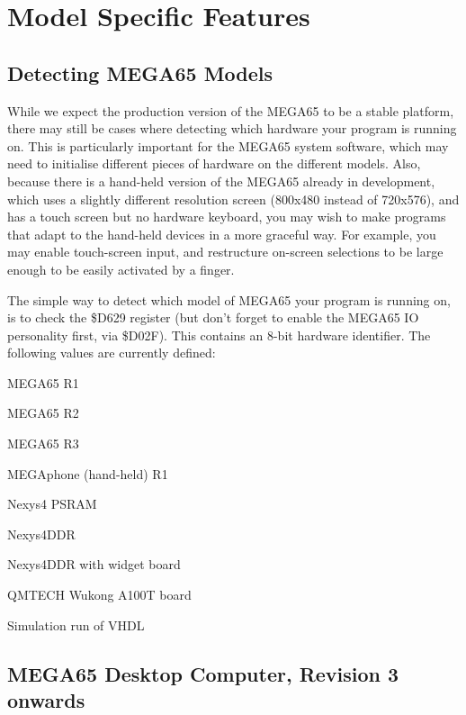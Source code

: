 \chapter{Model Specific Features}

\section{Detecting MEGA65 Models}

While we expect the production version of the MEGA65 to be a stable platform, there may still be
cases where detecting which hardware your program is running on. This is particularly important
for the MEGA65 system software, which may need to initialise different pieces of hardware on the
different models.  Also, because there is a hand-held version of the MEGA65 already  in development,
which uses a slightly different resolution screen (800x480 instead of 720x576), and has a touch
screen but no hardware keyboard, you may wish to make programs that adapt to the hand-held
devices in a more graceful way. For example, you may enable touch-screen input, and restructure
on-screen selections to be large enough to be easily activated by a finger.

The simple way to detect which model of MEGA65 your program is running on, is to check the
\$D629 register (but don't forget to enable the MEGA65 IO personality first, via \$D02F).
This contains an 8-bit hardware identifier.  The following values are currently defined:

\begin{description}[align=left,labelwidth=0.2cm]
\item[\$01 (1)] MEGA65 R1
\item[\$02 (2)] MEGA65 R2
\item[\$03 (3)] MEGA65 R3
\item[\$21 (33)] MEGAphone (hand-held) R1
\item[\$40 (64)] Nexys4 PSRAM
\item[\$41 (65)] Nexys4DDR
\item[\$42 (66)] Nexys4DDR with widget board
\item[\$FD (253)] QMTECH Wukong A100T board
\item[\$FE (254)] Simulation run of VHDL
\end{description}


\section{MEGA65 Desktop Computer, Revision 3 onwards}

